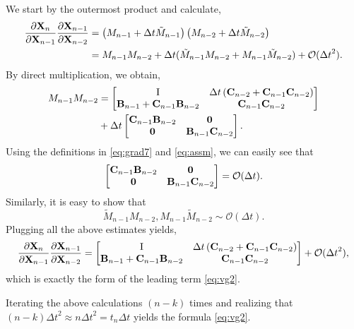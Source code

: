 \documentclass{article} \usepackage{iclr2021_conference,times}
\newcommand{\bX}{{\bf X}}
\newcommand{\bB}{{\bf B}}
\newcommand{\bC}{{\bf C}}
\newcommand{\ord}{{\mathcal O}}
\newcommand{\Dt}{{\Delta t}}
\newcommand{\ind}{\mathrm{I}}
\begin{document}
We start by the outermost product and calculate,
\begin{align*}
    \frac{\partial \bX_n}{\partial \bX_{n-1}}\frac{\partial \bX_{n-1}}{\partial \bX_{n-2}} &= 
    \left(M_{n-1} + \Dt \tilde{M}_{n-1}\right)\left(M_{n-2} + \Dt \tilde{M}_{n-2}\right) \\
    &= M_{n-1}M_{n-2} + \Dt(\tilde{M}_{n-1}M_{n-2} + M_{n-1}\tilde{M}_{n-2}) + \ord(\Dt^2).
\end{align*}
By direct multiplication, we obtain,
\begin{align*}
 M_{n-1}M_{n-2} &= \begin{bmatrix}
                                                           \ind  & \Dt \left(\bC_{n-2}+ \bC_{n-1} \bC_{n-2} \right)\\ 
        \bB_{n-1}+\bC_{n-1}\bB_{n-2} & \bC_{n-1} \bC_{n-2}
        \end{bmatrix}  \\
        &+ \Dt \begin{bmatrix}
                                               \bC_{n-1}\bB_{n-2}              & {\bf 0} \\
        {\bf 0} & \bB_{n-1}\bC_{n-2}
        \end{bmatrix}.
\end{align*}
Using the definitions in \eqref{eq:grad7} and \eqref{eq:assm}, we can easily see that
$$
\begin{bmatrix}
                                               \bC_{n-1}\bB_{n-2}              & {\bf 0} \\
        {\bf 0} & \bB_{n-1}\bC_{n-2}
        \end{bmatrix}  = \ord(\Dt).
$$
Similarly, it is easy to show that
$$
\tilde{M}_{n-1}M_{n-2}, M_{n-1}\tilde{M}_{n-2} \sim \ord(\Dt).
$$
Plugging all the above estimates yields,
$$
\frac{\partial \bX_n}{\partial \bX_{n-1}}\frac{\partial \bX_{n-1}}{\partial \bX_{n-2}}  
    = \begin{bmatrix}
                                                           \ind  & \Dt \left(\bC_{n-2}+ \bC_{n-1} \bC_{n-2} \right)\\ 
        \bB_{n-1}+\bC_{n-1}\bB_{n-2} & \bC_{n-1} \bC_{n-2}
        \end{bmatrix} + \ord(\Dt^2),
$$
which is exactly the form of the leading term \eqref{eq:vg2}.

Iterating the above calculations $(n-k)$ times and realizing that $(n-k)\Dt^2 \approx n\Dt^2 = t_n \Dt$ yields the formula \eqref{eq:vg2}. 
\end{document}
